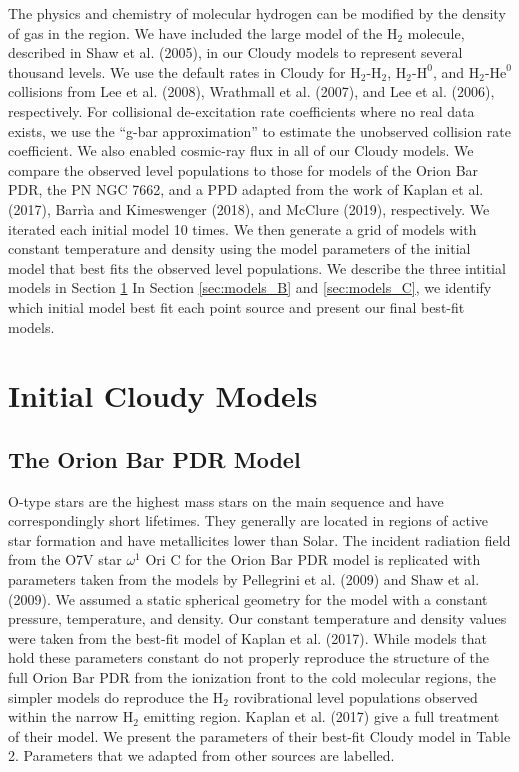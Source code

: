 \documentclass[12pt, letterpaper]{book}
\begin{document}
The physics and chemistry of molecular hydrogen can be modified by the density of gas in the region. We have included the large model of the $\textrm{H}_2$ molecule, described in Shaw et al. (2005), in our Cloudy models to represent several thousand levels. We use the default rates in Cloudy for $\textrm{H}_2$-$\textrm{H}_2$, $\textrm{H}_2$-$\textrm{H}^0$, and $\textrm{H}_2$-$\textrm{He}^0$ collisions from Lee et al. (2008), Wrathmall et al. (2007), and Lee et al. (2006), respectively. For collisional de-excitation rate coefficients where no real data exists, we use the ``g-bar approximation'' to estimate the unobserved collision rate coefficient. We also enabled cosmic-ray flux in all of our Cloudy models. We compare the observed level populations to those for models of the Orion Bar PDR, the PN NGC 7662, and a PPD adapted from the work of Kaplan et al. (2017), Barr\`ia and Kimeswenger (2018), and McClure (2019), respectively. We iterated each initial model 10 times. We then generate a grid of models with constant temperature and density using the model parameters of the initial model that best fits the observed level populations. We describe the three intitial models in Section \ref{sec:models_A} In Section \ref{sec:models_B} and \ref{sec:models_C}, we identify which initial model best fit each point source and present our final best-fit models.

\section{Initial Cloudy Models}
\label{sec:models_A}
\subsection{The Orion Bar PDR Model}
O-type stars are the highest mass stars on the main sequence and have correspondingly short lifetimes. They generally are located in regions of active star formation and have metallicites lower than Solar. The incident radiation field from the O7V star $\omega^1$ Ori C for the Orion Bar PDR model is replicated with parameters taken from the models by Pellegrini et al. (2009) and Shaw et al. (2009). We assumed a static spherical geometry for the model with a constant pressure, temperature, and density. Our constant temperature and density values were taken from the best-fit model of Kaplan et al. (2017). While models that hold these parameters constant do not properly reproduce the structure of the full Orion Bar PDR from the ionization front to the cold molecular regions, the simpler models do reproduce the $\textrm{H}_2$ rovibrational level populations observed within the narrow $\textrm{H}_2$ emitting region. Kaplan et al. (2017) give a full treatment of their model. We present the parameters of their best-fit Cloudy model in Table 2. Parameters that we adapted from other sources are labelled.
\end{document}
